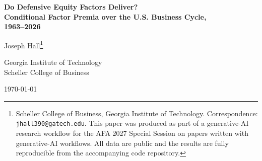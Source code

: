 \documentclass[12pt]{article}
\begin{document}
\begin{titlepage}
\begin{center}
\vspace*{0.5in}
{\LARGE\bfseries Do Defensive Equity Factors Deliver?\\[0.35em]
Conditional Factor Premia over the U.S. Business Cycle,\\[0.2em]
1963--2026\par}

\vspace{0.6in}
{\large Joseph Hall\footnote{Scheller College of Business, Georgia Institute of
Technology. Correspondence: \texttt{jhall390@gatech.edu}. This paper was
produced as part of a generative-AI research workflow for the AFA 2027 Special
Session on papers written with generative-AI workflows. All data are public and
the results are fully reproducible from the accompanying code repository.}\par}

\vspace{0.12in}
{\normalsize Georgia Institute of Technology\\Scheller College of Business\par}

\vspace{0.25in}
{\large \today\par}

\vspace{0.6in}
\begin{abstract}
\noindent
{}
A large practitioner literature markets ``quality,'' profitability, and
low-investment strategies as \emph{defensive}: equity factors that protect
capital when the economy contracts. We test this claim directly by measuring
the realized premia of the five Fama--French factors and momentum conditional
on the National Bureau of Economic Research (NBER) business-cycle state over
\nMonths{} months from \sampStart{} to \sampEnd. The evidence is sharply
heterogeneous. The market premium is strongly procyclical, falling by
\mktRecDiff{} percentage points per year in recessions; momentum is the most
cyclical long-short factor, earning \momRecDiff{} points per year less in
contractions and suffering its worst single month ($\momWorst\%$ in
\momWorstDate). In contrast, the investment (CMA) and profitability (RMW)
factors are genuinely defensive: their premia \emph{rise} in recessions
($+\cmaRecDiff$ and $+\rmwRecDiff$ points per year, respectively), and CMA's
annualized Sharpe ratio climbs from \cmaSharpeE{} in expansions to
\cmaSharpeR{} in recessions. Size and value display no reliable cyclicality.
The pattern survives replacement of the look-ahead NBER classification with a
real-time, tradeable bear-market signal, and is visible in event time around
both peaks and troughs. We conclude that ``defensiveness'' is a property of
specific factors---those tied to firm fundamentals rather than to price
trends---and not a generic feature of the factor zoo.
\end{abstract}
\end{center}
\end{titlepage}
\end{document}

